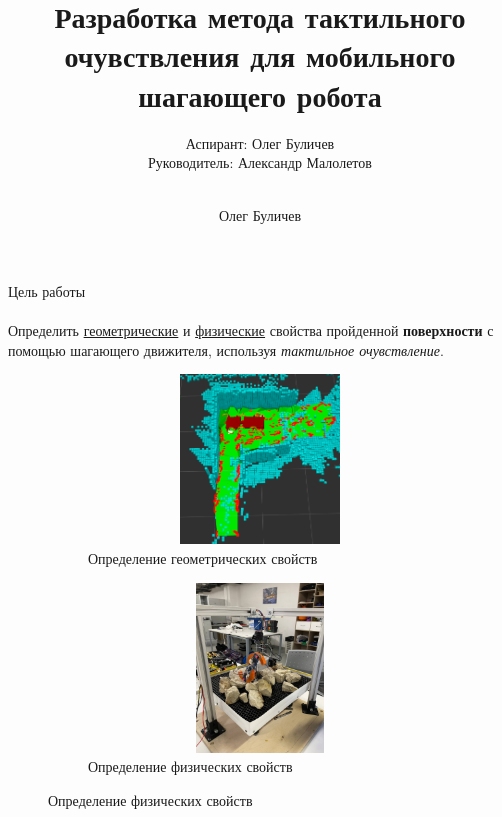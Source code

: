 \documentclass[aspectratio=169,xcolor=table]{beamer}
\title[Диссертация]{Разработка метода тактильного очувствления для мобильного шагающего робота} %
\subtitle{Аспирант: Олег Буличев \\ Руководитель: Александр Малолетов \\ \ } %
\author{Олег Буличев}
\newcommand{\fbckg}[1]{\usebackgroundtemplate{\texttt{[image: \#1]}}}%
\begin{document}
\setlength{\abovedisplayskip}{0pt}
\setlength{\belowdisplayskip}{0pt}
\setlength{\abovedisplayshortskip}{0pt}
\setlength{\belowdisplayshortskip}{0pt}

\fbckg{fibeamer/figs/title_page.png}

\fbckg{fibeamer/figs/common.png}

\begin{frame}[t]{Цель работы}
\framesubtitle{}
\vspace{-0.4cm}
    Определить \underline{геометрические} и \underline{физические} свойства пройденной \textbf{поверхности} с помощью шагающего движителя, используя \textit{тактильное очувствление}.

\begin{figure}[H]
    \begin{subfigure}{0.49\textwidth}
        \centering\includegraphics[height=4.5cm,width=1\textwidth,keepaspectratio]{conv_concave.png}
        \caption*{Определение геометрических свойств}
    \end{subfigure}
    \begin{subfigure}{0.49\textwidth}
        \centering\includegraphics[height=4.5cm,width=1\textwidth,keepaspectratio]{s_shape_leg/view.jpg}
        \caption*{Определение физических свойств}
        \label{fig:s_shape_leg/view.jpg}
    \end{subfigure}
\end{figure}

\end{frame}
\end{document}
